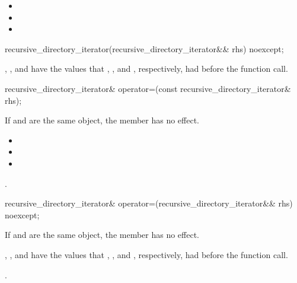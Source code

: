 \begin{itemdescr}
\pnum
\ensures
\begin{itemize}
\item {}
\item {}
\item {}
\end{itemize}
\end{itemdescr}

%
\begin{itemdecl}
recursive_directory_iterator(recursive_directory_iterator&& rhs) noexcept;
\end{itemdecl}

\begin{itemdescr}
\pnum
\ensures
{}, ,
  and  have the values that
  , , and
  , respectively, had before the function call.
\end{itemdescr}

%
\begin{itemdecl}
recursive_directory_iterator& operator=(const recursive_directory_iterator& rhs);
\end{itemdecl}

\begin{itemdescr}
\pnum
\effects
If  and  are the same
  object, the member has no effect.

\pnum
\ensures
\begin{itemize}
\item {}
\item {}
\item {}
\end{itemize}

\pnum
\returns
{}.
\end{itemdescr}

%
\begin{itemdecl}
recursive_directory_iterator& operator=(recursive_directory_iterator&& rhs) noexcept;
\end{itemdecl}

\begin{itemdescr}
\pnum
\effects
If  and  are the same
object, the member has no effect.

\pnum
\ensures
{}, ,
and  have the values that ,
, and , respectively, had before the function call.

\pnum
\returns
{}.
\end{itemdescr}

